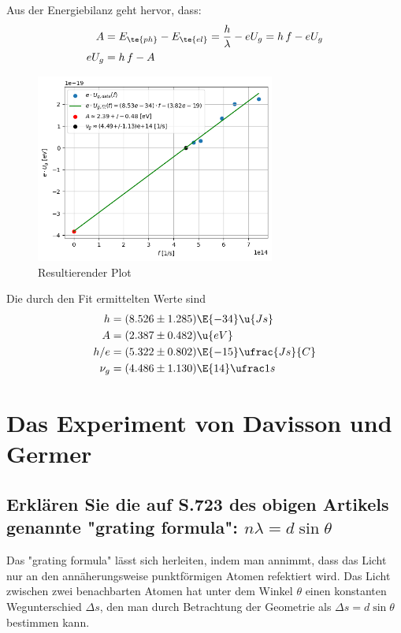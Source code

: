 \documentclass[ex,minted]{exercise}
\begin{document}
\dottedlinett

Aus der Energiebilanz geht hervor, dass:
\begin{align*}
    A &= E_{\te{ph}} - E_{\te{el}} 
    = \frac{h}{\lambda}- e U_g = 
    h\,f - e U_g \\
    e U_g &= h\,f-A
\end{align*}



\begin{figure}[H]
    \centering
    \includegraphics[width=0.7\textwidth]{2.png}
    \caption{Resultierender Plot}
\end{figure}

Die durch den Fit ermittelten Werte sind
\begin{align*}
    h &= (8.526\pm1.285)\E{-34} \u{Js}\\
    A &= (2.387\pm0.482) \u{eV}\\
    h/e &= (5.322\pm0.802)\E{-15} \ufrac{Js}{C}\\
    \nu_g &= (4.486\pm1.130)\E{14} \ufrac1s 
\end{align*}


\section{Das Experiment von Davisson und Germer}
\subsection{Erklären Sie die auf S.723 des obigen Artikels genannte "grating formula": 
\(n\lambda = d\sin\theta\)}

\dottedlinett

Das "grating formula"{} lässt sich herleiten, indem man annimmt, dass das
Licht nur an den annäherungsweise punktförmigen Atomen refektiert wird. 
Das Licht zwischen zwei benachbarten Atomen hat unter dem Winkel 
\(\theta\) einen konstanten Wegunterschied \(\Delta s\),
den man durch Betrachtung der Geometrie als \(\Delta s = d\sin\theta\)
bestimmen kann. 
\end{document}
